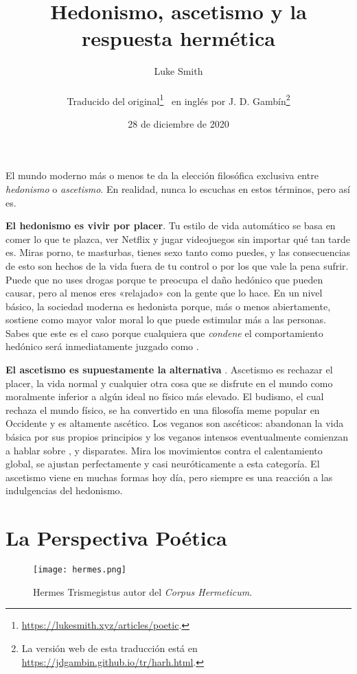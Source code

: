 \documentclass{article}
\title{Hedonismo, ascetismo y la respuesta hermética}
\author
{
	Luke Smith\\\\
	\small
	{
		Traducido del
		original\footnote{\url{https://lukesmith.xyz/articles/poetic}.}
		\ en inglés por J. D. Gambín\footnote{La versión web de esta
		traducción está en \url{https://jdgambin.github.io/tr/harh.html}.}
	}
}
\date{\small{28 de diciembre de 2020}}
\begin{document}
	\maketitle

	El mundo moderno más o menos te da la elección filosófica
	exclusiva entre \textit{hedonismo} o \textit{ascetismo}.
	En realidad, nunca lo escuchas en estos términos, pero así es.

	\textbf{El hedonismo es vivir por placer}. Tu estilo de vida automático
	se basa en comer lo que te plazca, ver Netflix y jugar videojuegos sin
	importar qué tan tarde es. Miras porno, te masturbas, tienes sexo tanto
	como puedes, y las consecuencias de esto son hechos de la vida fuera de
	tu control o por los que vale la pena sufrir. Puede que no uses drogas
	porque te preocupa el daño hedónico que pueden causar, pero al menos
	eres «relajado» con la gente que lo hace. En un nivel básico, la
	sociedad moderna es hedonista porque, más o menos abiertamente, sostiene
	como mayor valor moral lo que puede estimular más a las personas. Sabes
	que este es el caso porque cualquiera que \textit{condene} el
	comportamiento hedónico será inmediatamente juzgado como
	.

	\textbf{El ascetismo es supuestamente la alternativa
	}. Ascetismo es rechazar el placer, la vida normal
	y cualquier otra cosa que se disfrute en el mundo como moralmente
	inferior a algún ideal no físico más elevado. El budismo, el cual
	rechaza el mundo físico, se ha convertido en una filosofía meme popular
	en Occidente y es altamente ascético. Los veganos son ascéticos:
	abandonan la vida básica por sus propios principios y los veganos
	intensos eventualmente comienzan a hablar sobre ,
	 y disparates. Mira los movimientos contra el
	calentamiento global, se ajustan perfectamente y casi neuróticamente a
	esta categoría. El ascetismo viene en muchas formas hoy día, pero
	siempre es una reacción a las indulgencias del hedonismo.

	\newpage

	\section*{La Perspectiva Poética}

	\begin{figure}[ht]
	\centering
	\texttt{[image: hermes.png]}
	\caption*{Hermes Trismegistus
	\protect\footnotemark{}
	autor del \textit{Corpus Hermeticum}.}
	\end{figure}
\end{document}
